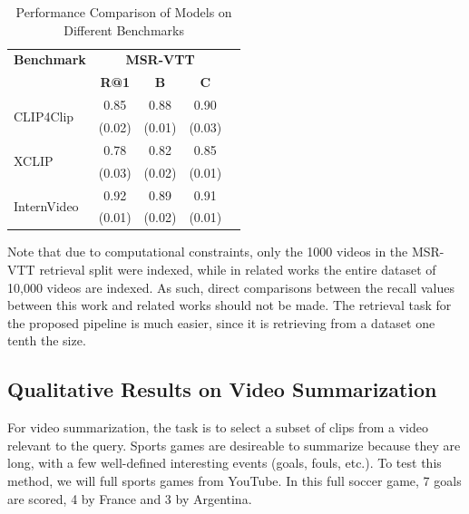 \documentclass{article}
\begin{document}
\begin{table}[htbp]
  \centering
  \begin{tabular}{lcccc}
    \toprule
    \textbf{Benchmark} & \multicolumn{3}{c}{\textbf{MSR-VTT}} \\
    \cmidrule(lr){2-4}
    & \textbf{R@1} & \textbf{B} & \textbf{C} \\
    \midrule
    \multirow{2}{*}{CLIP4Clip} & 0.85 & 0.88 & 0.90 \\
    & (0.02) & (0.01) & (0.03) \\
    \midrule
    \multirow{2}{*}{XCLIP} & 0.78 & 0.82 & 0.85 \\
    & (0.03) & (0.02) & (0.01) \\
    \midrule
    \multirow{2}{*}{InternVideo} & 0.92 & 0.89 & 0.91 \\
    & (0.01) & (0.02) & (0.01) \\
    \bottomrule
  \end{tabular}
  \label{tab:model_comparison}
  \caption{Performance Comparison of Models on Different Benchmarks}
\end{table}

Note that due to computational constraints, only the 1000 videos in the MSR-VTT retrieval split were indexed, while in related works the entire dataset of 10,000 videos are indexed.
As such, direct comparisons between the recall values between this work and related works should not be made.
The retrieval task for the proposed pipeline is much easier, since it is retrieving from a dataset one tenth the size.

\subsection{Qualitative Results on Video Summarization}
For video summarization, the task is to select a subset of clips from a video relevant to the query.
Sports games are desireable to summarize because they are long, with a few well-defined interesting events (goals, fouls, etc.).
To test this method, we will full sports games from YouTube.
In this full soccer game, 7 goals are scored, 4 by France and 3 by Argentina.
\end{document}
